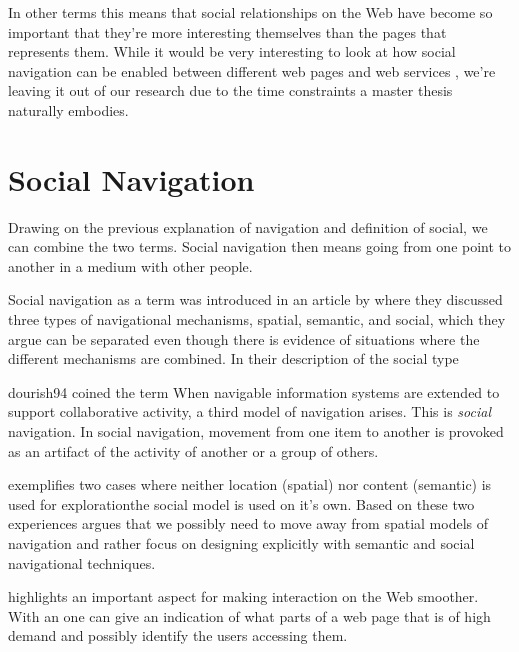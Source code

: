 In other terms this means that social relationships on the Web have become so
important that they're more interesting themselves than the pages that
represents them. While it would be very interesting to look at how social
navigation can be enabled between different web pages and web services%
,
we're leaving it out of our research due to the time constraints a master
thesis naturally embodies.

\section{Social Navigation}
\label{section:background.social.navigation}
Drawing on the previous explanation of navigation and definition of social, we
can combine the two terms. Social navigation then means going from one point
to another in a medium with other people.

Social navigation as a term was introduced in an article by
\citet{dourish94} where they discussed three types of navigational mechanisms,
spatial, semantic, and social, which they argue can be separated even though
there is evidence of situations where the different mechanisms are combined.
In their description of the social type
\begin{fullquote}[p.~1]{dourish94}{%
  coined the term }
    When navigable information systems are extended to support collaborative
    activity, a third model of navigation arises. This is \emph{social}
    navigation. In social navigation, movement from one item to another is
    provoked as an artifact of the activity of another or a group of others.
\end{fullquote}

\citeauthor{dourish94} exemplifies two cases where neither location
(spatial) nor content (semantic) is used for exploration\dash{}the social
model is used on it's own. Based on these two experiences
\citeauthor{dourish94} argues that we possibly need to move away from spatial
models of navigation and rather focus on designing explicitly with semantic
and social navigational techniques.

\citeauthor{dieberger97} highlights an important aspect for making interaction
on the Web smoother. With an
one can give an indication of what parts of a web page that is of high demand
and possibly identify the users accessing them.

